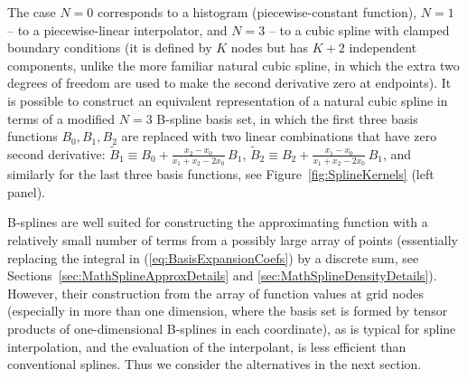 \documentclass[12pt]{article}
\begin{document}
The case $N=0$ corresponds to a histogram (piecewise-constant function), $N=1$ -- to a piecewise-linear interpolator, and $N=3$ -- to a cubic spline with clamped boundary conditions (it is defined by $K$ nodes but has $K+2$ independent components, unlike the more familiar natural cubic spline, in which the extra two degrees of freedom are used to make the second derivative zero at endpoints). It is possible to construct an equivalent representation of a natural cubic spline in terms of a modified $N=3$ B-spline basis set, in which the first three basis functions $B_0, B_1, B_2$ are replaced with two linear combinations that have zero second derivative: $\tilde B_1 \equiv B_0 + \frac{x_2-x_0}{x_1+x_2-2x_0}\,B_1$, $\tilde B_2 \equiv B_2 + \frac{x_1-x_0}{x_1+x_2-2x_0}\,B_1$, and similarly for the last three basis functions, see Figure~\ref{fig:SplineKernels} (left panel).

B-splines are well suited for constructing the approximating function with a relatively small number of terms from a possibly large array of points (essentially replacing the integral in (\ref{eq:BasisExpansionCoefs}) by a discrete sum, see Sections~\ref{sec:MathSplineApproxDetails} and \ref{sec:MathSplineDensityDetails}). However, their construction from the array of function values at grid nodes (especially in more than one dimension, where the basis set is formed by tensor products of one-dimensional B-splines in each coordinate), as is typical for spline interpolation, and the evaluation of the interpolant, is less efficient than conventional splines. Thus we consider the alternatives in the next section.
\end{document}
